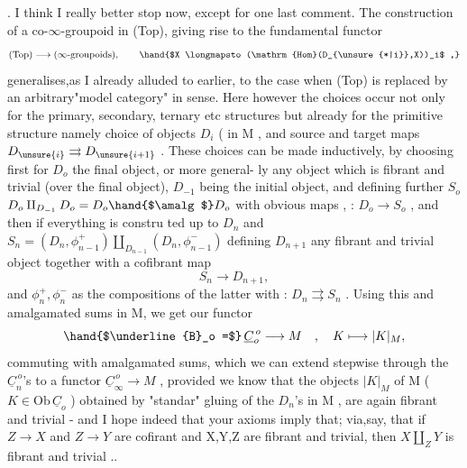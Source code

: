 

. I think I really better stop now, except for one last comment. The
construction of a co-$\infty$-groupoid  in (Top), giving rise to the fundamental
functor
\[ \text{(Top)} \longrightarrow (\infty\text{-groupoids}), \qquad \hand{$X \longmapsto (\mathrm{Hom}(D_{\unsure{*|i}},X))_i$ ,} \]
generalises,as I already alluded to earlier, to the case when (Top) is
replaced by an arbitrary"model category" in   sense. Here however the
choices occur not only  for the primary, secondary, ternary etc structures\hand{,}
but already for the primitive structure\hand{,} namely  choice of objects $D_i$ (
in M , and source and target maps $D_{\unsure{i}} \rightrightarrows D_{\unsure{i+1}}$ . These choices can be made
inductively, by choosing first for $D_o$ the final object, or more general-%
ly any object which is fibrant and trivial (over the final object), $D_{-1}$
being the initial object, and defining further $S_o$  $D_o\amalg_{D_{-1}} D_o = D_o \hand{$\amalg$} D_o$
with obvious maps  ,  : $D_o \to S_o$ , and then \hand{,}if everything is constru\hand{-}
ted up to $D_n$ \deleted{\unsure{,}} and $S_n = (D_n,\phi_{n-1}^+)\amalg_{D_{n-1}}(D_n,\phi_{n-1}^-)$\hand{,} defining $D_{n+1}$  any
fibrant and trivial object together with a cofibrant map
\[ S_n \longrightarrow D_{n+1} , \]
and $\phi_n^+ , \phi_n^-$ as the compositions of the latter with  : $D_n \rightrightarrows S_n$ .
Using this and amalgamated sums in M, we get our functor
\[ \hand{$\underline{B}_o =$}\, \underline{C}_o^{\,o} \longrightarrow M \quad , \quad K \longmapsto |K|_M , \]
commuting with amalgamated sums, which we can extend stepwise through
the $\underline{C}_n^{\,o}$'s to a functor  $\underline{C}_\infty^{\,o} \to M$ , provided we know that the objects
$|K|_M$ of M ( $K \in \mathrm{Ob}\,\underline{C}_o$ ) obtained  by "standar" gluing of the
$D_n$'s in M , are again fibrant and trivial - and I hope indeed that
your axioms imply that; via,say, that if $Z\to X$ and $Z \to Y$ are cofirant
and X,Y,Z are fibrant and trivial, then $X\amalg_Z Y$ is fibrant and trivial ..


